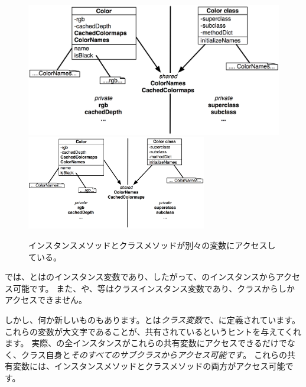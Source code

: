 \documentclass[a4paper,10pt,twoside]{book}
\begin{document}
\begin{figure}[htb]
\begin{center}
\ifluluelse
	{\includegraphics[width=\textwidth]{privateSharedVarColor}}
	{\includegraphics[width=0.7\textwidth]{privateSharedVarColor}}
\caption{インスタンスメソッドとクラスメソッドが別々の変数にアクセスしている。}
\end{center}
\end{figure}

では、とはのインスタンス変数であり、したがって、のインスタンスからアクセス可能です。
また、や、等はクラスインスタンス変数であり、クラスからしかアクセスできません。

しかし、何か新しいものもあります。とは\emph{クラス変数}で、に定義されています。
これらの変数が大文字であることが、共有されているというヒントを与えてくれます。
実際、の全インスタンスがこれらの共有変数にアクセスできるだけでなく、クラス自身と\emph{そのすべてのサブクラスからアクセス可能です}。
これらの共有変数には、インスタンスメソッドとクラスメソッドの両方がアクセス可能です。

\end{document}
